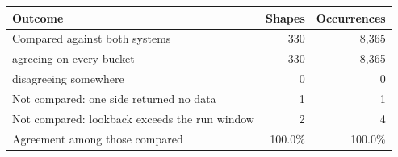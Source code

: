 \begin{tabular}{@{}lrr@{}}
\toprule
Outcome & Shapes & Occurrences \\
\midrule
Compared against both systems & 330 & 8,365 \\
\quad agreeing on every bucket & 330 & 8,365 \\
\quad disagreeing somewhere & 0 & 0 \\
Not compared: one side returned no data & 1 & 1 \\
Not compared: lookback exceeds the run window & 2 & 4 \\
\midrule Agreement among those compared & 100.0\% & 100.0\% \\
\bottomrule
\end{tabular}
